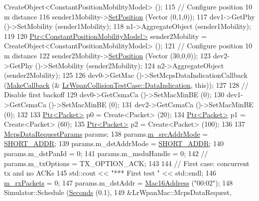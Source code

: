 \begin{DoxyCode}
      CreateObject<ConstantPositionMobilityModel> ();
115   \textcolor{comment}{// Configure position 10 m distance}
116   sender1Mobility->\hyperlink{classns3_1_1MobilityModel_ac584b3d5a309709d2f13ed6ada1e7640}{SetPosition} (Vector (0,1,0));
117   dev1->GetPhy ()->SetMobility (sender1Mobility);
118   n1->AggregateObject (sender1Mobility);
119 
120   \hyperlink{classns3_1_1Ptr}{Ptr<ConstantPositionMobilityModel>} sender2Mobility = 
      CreateObject<ConstantPositionMobilityModel> ();
121   \textcolor{comment}{// Configure position 10 m distance}
122   sender2Mobility->\hyperlink{classns3_1_1MobilityModel_ac584b3d5a309709d2f13ed6ada1e7640}{SetPosition} (Vector (30,0,0));
123   dev2->GetPhy ()->SetMobility (sender2Mobility);
124   n2->AggregateObject (sender2Mobility);
125 
126   dev0->GetMac ()->SetMcpsDataIndicationCallback (\hyperlink{group__makecallbackmemptr_ga9376283685aa99d204048d6a4b7610a4}{MakeCallback} (&
      \hyperlink{classLrWpanCollisionTestCase_ab8b8d230a2bad7026b0b48a011f7c049}{LrWpanCollisionTestCase::DataIndication}, \textcolor{keyword}{this}));
127 
128   \textcolor{comment}{// Disable first backoff}
129   dev0->GetCsmaCa ()->SetMacMinBE (0);
130   dev1->GetCsmaCa ()->SetMacMinBE (0);
131   dev2->GetCsmaCa ()->SetMacMinBE (0);
132 
133   \hyperlink{classns3_1_1Ptr}{Ptr<Packet>} p0 = Create<Packet> (20);
134   \hyperlink{classns3_1_1Ptr}{Ptr<Packet>} p1 = Create<Packet> (60);
135   \hyperlink{classns3_1_1Ptr}{Ptr<Packet>} p2 = Create<Packet> (100);
136 
137   \hyperlink{structns3_1_1McpsDataRequestParams}{McpsDataRequestParams} params;
138   params.\hyperlink{structns3_1_1McpsDataRequestParams_a31f4c281d07cf3b5992d45416bd71309}{m\_srcAddrMode} = \hyperlink{group__lr-wpan_gga9ea4702ab11d5329e1593afebce06bbba7bf58267dde39bdabfeeb5793450c5e3}{SHORT\_ADDR};
139   params.m\_dstAddrMode = \hyperlink{group__lr-wpan_gga9ea4702ab11d5329e1593afebce06bbba7bf58267dde39bdabfeeb5793450c5e3}{SHORT\_ADDR};
140   params.m\_dstPanId = 0;
141   params.m\_msduHandle = 0;
142   \textcolor{comment}{// params.m\_txOptions = TX\_OPTION\_ACK;}
143 
144   \textcolor{comment}{// First case: concurrent tx and no ACKs}
145   std::cout << \textcolor{stringliteral}{"*** First test "} << std::endl;
146   \hyperlink{classLrWpanCollisionTestCase_a99c5c25759f67c884349444a74a86186}{m\_rxPackets} = 0;
147   params.m\_dstAddr = \hyperlink{classns3_1_1Mac16Address}{Mac16Address} (\textcolor{stringliteral}{"00:02"});
148   Simulator::Schedule (\hyperlink{group__timecivil_ga33c34b816f8ff6628e33d5c8e9713b9e}{Seconds} (0.1),
149                        &LrWpanMac::McpsDataRequest,

\end{DoxyCode}
